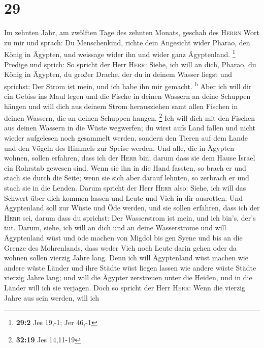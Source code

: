 \hypertarget{section-28}{%
\section{29}\label{section-28}}

 Im zehnten Jahr, am zwölften Tage des zehnten Monats,
geschah des \textsc{Herrn} Wort zu mir und sprach:  Du
Menschenkind, richte dein Angesicht wider Pharao, den König in Ägypten,
und weissage wider ihn und wider ganz Ägyptenland. \footnote{\textbf{29:2}
  Jes 19,-1; Jer 46,-1}  Predige und sprich: So spricht
der Herr \textsc{Herr}: Siehe, ich will an dich, Pharao, du König in
Ägypten, du großer Drache, der du in deinem Wasser liegst und sprichst:
Der Strom ist mein, und ich habe ihn mir gemacht. \textsuperscript{b}
 Aber ich will dir ein Gebiss ins Maul legen und die
Fische in deinen Wassern an deine Schuppen hängen und will dich aus
deinem Strom herausziehen samt allen Fischen in deinen Wassern, die an
deinen Schuppen hangen. \footnote{\textbf{32:19} Jes 14,11-19}
 Ich will dich mit den Fischen aus deinen Wassern in die
Wüste wegwerfen; du wirst aufs Land fallen und nicht wieder aufgelesen
noch gesammelt werden, sondern den Tieren auf dem Lande und den Vögeln
des Himmels zur Speise werden.  Und alle, die in Ägypten
wohnen, sollen erfahren, dass ich der \textsc{Herr} bin; darum dass sie
dem Hause Israel ein Rohrstab gewesen sind.  Wenn sie ihn
in die Hand fassten, so brach er und stach sie durch die Seite; wenn sie
sich aber darauf lehnten, so zerbrach er und stach sie in die Lenden.
 Darum spricht der Herr \textsc{Herr} also: Siehe, ich
will das Schwert über dich kommen lassen und Leute und Vieh in dir
ausrotten.  Und Ägyptenland soll zur Wüste und Öde werden,
und sie sollen erfahren, dass ich der \textsc{Herr} sei, darum dass du
sprichst: Der Wasserstrom ist mein, und ich bin's, der's tut.
 Darum, siehe, ich will an dich und an deine Wasserströme
und will Ägyptenland wüst und öde machen von Migdol bis gen Syene und
bis an die Grenze des Mohrenlands,  dass weder Vieh noch
Leute darin gehen oder da wohnen sollen vierzig Jahre lang.
 Denn ich will Ägyptenland wüst machen wie andere wüste
Länder und ihre Städte wüst liegen lassen wie andere wüste Städte
vierzig Jahre lang; und will die Ägypter zerstreuen unter die Heiden,
und in die Länder will ich sie verjagen.  Doch so spricht
der Herr \textsc{Herr}: Wenn die vierzig Jahre aus sein werden, will ich
